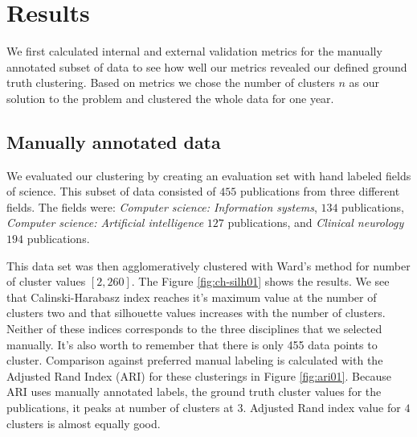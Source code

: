 \chapter{Results}
\label{chapter:results}

We first calculated internal and external validation metrics for 
the manually annotated subset of data to see how well our metrics 
revealed our defined ground truth clustering. Based on metrics we 
chose the number of clusters $n$ as our solution to the problem
and clustered the whole data for one year.

\section{Manually annotated data}
We evaluated our clustering by creating an evaluation set with
hand labeled fields of science. This subset of data consisted of 
$455$ publications from three different fields. The fields were:
\emph{Computer science: Information systems}, $134$ publications,
\emph{Computer science: Artificial intelligence} $127$ publications, 
and \emph{Clinical neurology} $194$ publications.

This data set was then agglomeratively clustered with Ward's 
method for number of cluster values $[2,260]$. The Figure 
\ref{fig:ch-silh01} shows the results. We see that
Calinski-Harabasz index reaches it's maximum value at the number
of clusters two and that silhouette values increases with the
number of clusters.
Neither of these indices corresponds to the three disciplines
that we selected manually. It's also worth to remember that there
is only 455 data points to cluster. Comparison against preferred
manual labeling is calculated with the 
Adjusted Rand Index (ARI) for these clusterings in Figure 
\ref{fig:ari01}. Because ARI uses manually annotated labels, the 
ground truth cluster values for the publications, it peaks at 
number of clusters at $3$. Adjusted Rand index value for $4$ 
clusters is almost equally good.

